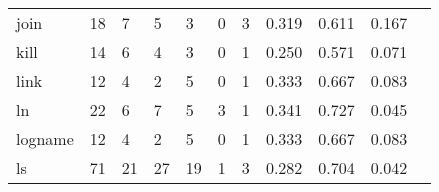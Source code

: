 \begin{longtable}{lp{1.2cm}p{1.2cm}p{1.2cm}p{1.2cm}p{1.2cm}p{1.2cm}p{1.2cm}p{1.2cm}p{1.2cm}p{1.2cm}}
join      &                                    18 &                                                  7 &                                                  5 &                                                  3 &                                                  0 &                                                  3 &                                         0.319 &                                              0.611 &                                              0.167 \\
kill      &                                    14 &                                                  6 &                                                  4 &                                                  3 &                                                  0 &                                                  1 &                                         0.250 &                                              0.571 &                                              0.071 \\
link      &                                    12 &                                                  4 &                                                  2 &                                                  5 &                                                  0 &                                                  1 &                                         0.333 &                                              0.667 &                                              0.083 \\
ln        &                                    22 &                                                  6 &                                                  7 &                                                  5 &                                                  3 &                                                  1 &                                         0.341 &                                              0.727 &                                              0.045 \\
logname   &                                    12 &                                                  4 &                                                  2 &                                                  5 &                                                  0 &                                                  1 &                                         0.333 &                                              0.667 &                                              0.083 \\
ls        &                                    71 &                                                 21 &                                                 27 &                                                 19 &                                                  1 &                                                  3 &                                         0.282 &                                              0.704 &                                              0.042 \\

\end{longtable}
